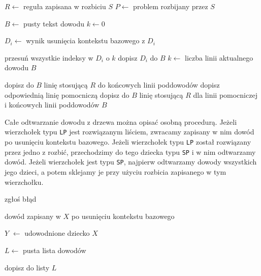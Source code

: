 \documentclass[shortabstract]{iithesis}
\theoremstyle{definition}
\theoremstyle{remark}
\theoremstyle{plain}
\begin{document}
\begin{algorithm}[H]
\caption{Sklejanie poddowodów jednego rozbicia}
\label{alg:glue-up}
\begin{algorithmic}[1]
    \State \(R \gets\) reguła zapisana w rozbiciu \(S\)
    \State \(P \gets\) problem rozbijany przez \(S\)


    \State \(B \gets\) pusty tekst dowodu
    \State \(k \gets 0\)

            \State \(D_i \gets\) wynik usunięcia kontekstu bazowego z \(D_i\)
        \EndIf

        \State przesuń wszystkie indeksy w \(D_i\) o \(k\)
        \State dopisz \(D_i\) do \(B\)
        \State \(k \gets\) liczba linii aktualnego dowodu \(B\)
    \EndFor

        \State dopisz do \(B\) linię stosującą \(R\) do końcowych linii poddowodów
    \Else
        \State dopisz odpowiednią linię pomocniczą
        \State dopisz do \(B\) linię stosującą \(R\) dla linii pomocniczej i końcowych linii poddowodów
    \EndIf
    \State \Return \(B\)
\EndProcedure
\end{algorithmic}
\end{algorithm}

Całe odtwarzanie dowodu z drzewa można opisać osobną procedurą. Jeżeli wierzchołek
typu \texttt{LP} jest rozwiązanym liściem, zwracamy zapisany w nim dowód po usunięciu
kontekstu bazowego. Jeżeli wierzchołek typu \texttt{LP} został rozwiązany przez jedno
z rozbić, przechodzimy do tego dziecka typu \texttt{SP} i w nim odtwarzamy dowód. Jeżeli wierzchołek jest typu
\texttt{SP}, najpierw odtwarzamy dowody wszystkich jego dzieci, a potem sklejamy je
przy użyciu rozbicia zapisanego w tym wierzchołku.

\begin{algorithm}[H]
\caption{Odtwarzanie dowodu z drzewa}
\label{alg:compose-proof}
\begin{algorithmic}[1]
        \State zgłoś błąd
    \EndIf

        \State \Return dowód zapisany w \(X\) po usunięciu kontekstu bazowego
    \EndIf

        \State \(Y\) \(\gets\) udowodnione dziecko \(X\)
        \State \Return {}
    \EndIf

        \State \(L \gets\) pusta lista dowodów

            \State dopisz  do listy \(L\)
        \EndFor

        \State \Return {}
    \EndIf
\EndProcedure
\end{algorithmic}
\end{algorithm}
\end{document}
